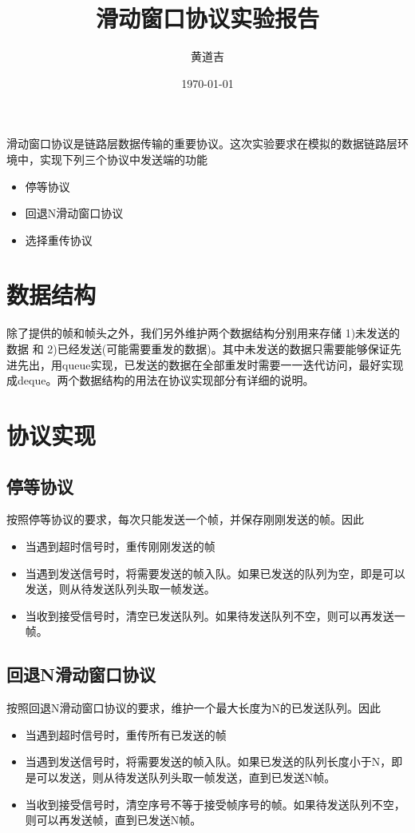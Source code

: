 \documentclass{article}
\author{黄道吉}
\title{滑动窗口协议实验报告}
\date{\today}
\begin{document}
\maketitle

滑动窗口协议是链路层数据传输的重要协议。这次实验要求在模拟的数据链路层环境中，实现下列三个协议中发送端的功能
\begin{itemize}
    \item 停等协议
    \item 回退N滑动窗口协议
    \item 选择重传协议
\end{itemize}

\section{数据结构}

除了提供的帧和帧头之外，我们另外维护两个数据结构分别用来存储 1)未发送的数据 和 2)已经发送(可能需要重发的数据)。其中未发送的数据只需要能够保证先进先出，用queue实现，已发送的数据在全部重发时需要一一迭代访问，最好实现成deque。两个数据结构的用法在协议实现部分有详细的说明。

\section{协议实现}

\subsection{停等协议}

按照停等协议的要求，每次只能发送一个帧，并保存刚刚发送的帧。因此
\begin{itemize}
    \item 当遇到超时信号时，重传刚刚发送的帧
    \item 当遇到发送信号时，将需要发送的帧入队。如果已发送的队列为空，即是可以发送，则从待发送队列头取一帧发送。
    \item 当收到接受信号时，清空已发送队列。如果待发送队列不空，则可以再发送一帧。
\end{itemize}

\subsection{回退N滑动窗口协议}

按照回退N滑动窗口协议的要求，维护一个最大长度为N的已发送队列。因此
\begin{itemize}
    \item 当遇到超时信号时，重传所有已发送的帧
    \item 当遇到发送信号时，将需要发送的帧入队。如果已发送的队列长度小于N，即是可以发送，则从待发送队列头取一帧发送，直到已发送N帧。
    \item 当收到接受信号时，清空序号不等于接受帧序号的帧。如果待发送队列不空，则可以再发送帧，直到已发送N帧。
\end{itemize}
\end{document}
